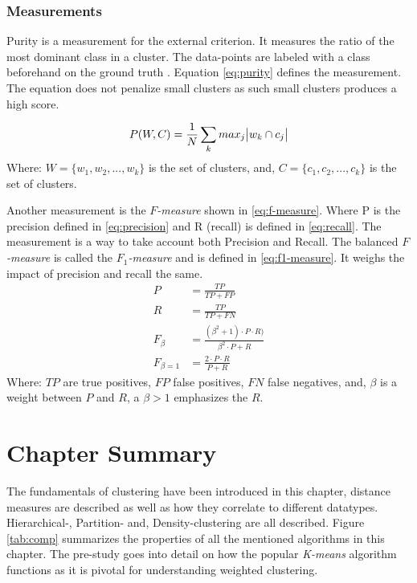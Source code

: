 \documentclass[../report.tex]{subfiles}
\begin{document}
\subsubsection{Measurements}
Purity is a measurement for the external criterion. It measures the ratio of the most dominant class in a cluster. The data-points are labeled with a class beforehand on the ground truth \cite{manning2010introduction}. Equation \ref{eq:purity} defines the measurement. The equation does not penalize small clusters as such small clusters produces a high score.

\begin{equation}
  \label{eq:purity}
  P(W, C) = \frac{1}{N}\sum_{k}max_{j}\abs{w_k \cap c_j}
\end{equation}
Where:\newline
$W = \{w_1,w_2,...,w_k\}$ is the set of clusters, and,
$C = \{c_1,c_2,...,c_k\}$ is the set of clusters.

Another measurement is the \textit{$F$-measure} shown in \ref{eq:f-measure}\cite{manning2010introduction}. Where P is the precision defined in \ref{eq:precision} and R (recall) is defined in \ref{eq:recall}. The measurement is a way to take account both Precision and Recall. The balanced \textit{$F$-measure} is called the \textit{$F_1$-measure} and is defined in \ref{eq:f1-measure}. It weighs the impact of precision and recall the same.
\begin{align}
  \label{eq:precision}
  P &= \frac{TP}{TP+FP} \\
  \label{eq:recall}
  R &= \frac{TP}{TP+FN} \\
  \label{eq:f-measure}
  F_\beta &= \frac{(\beta^2 + 1) \cdot P \cdot R)}{\beta^2 \cdot P + R} \\
  \label{eq:f1-measure}
  F_{\beta = 1} &= \frac{2 \cdot P \cdot R}{P + R}
\end{align}
Where:\newline
$TP$ are true positives, $FP$ false positives, $FN$ false negatives, and, $\beta$ is a weight between $P$ and $R$, a $\beta > 1$ emphasizes the $R$.

\section{Chapter Summary}
The fundamentals of clustering have been introduced in this chapter, distance measures are described as well as how they correlate to different datatypes. Hierarchical-, Partition- and, Density-clustering are all described. Figure \ref{tab:comp} summarizes the properties of all the mentioned algorithms in this chapter. The pre-study goes into detail on how the popular \textit{K-means} algorithm functions as it is pivotal for understanding weighted clustering.
\end{document}
